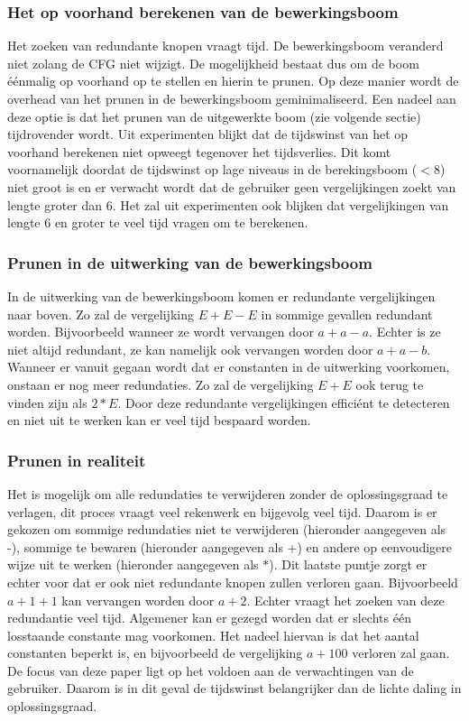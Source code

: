 \documentclass[Main.tex]{subfiles}
\begin{document}
\subsubsection*{Het op voorhand berekenen van de bewerkingsboom}
Het zoeken van redundante knopen vraagt tijd. De bewerkingsboom veranderd niet zolang de CFG niet wijzigt. De mogelijkheid bestaat dus om de boom \'e\'enmalig op voorhand op te stellen en hierin te prunen. Op deze manier wordt de overhead van het prunen in de bewerkingsboom geminimaliseerd. Een nadeel aan deze optie is dat het prunen van de uitgewerkte boom (zie volgende sectie) tijdrovender wordt. Uit experimenten blijkt dat de tijdswinst van het op voorhand berekenen niet opweegt tegenover het tijdsverlies. Dit komt voornamelijk doordat de tijdswinst op lage niveaus in de berekingsboom ($< 8$) niet groot is en er verwacht wordt dat de gebruiker geen vergelijkingen zoekt van lengte groter dan 6. Het zal uit experimenten ook blijken dat vergelijkingen van lengte 6 en groter te veel tijd vragen om te berekenen. 

\subsubsection*{Prunen in de uitwerking van de bewerkingsboom}
In de uitwerking van de bewerkingsboom komen er redundante vergelijkingen naar boven. Zo zal de vergelijking $E+E-E$ in sommige gevallen redundant worden. Bijvoorbeeld wanneer ze wordt vervangen door $a+a-a$. Echter is ze niet altijd redundant, ze kan namelijk ook vervangen worden door $a+a-b$. Wanneer er vanuit gegaan wordt dat er constanten in de uitwerking voorkomen, onstaan er nog meer redundaties. Zo zal de vergelijking $E+E$ ook terug te vinden zijn als $2*E$. Door deze redundante vergelijkingen effici\'ent te detecteren en niet uit te werken kan er veel tijd bespaard worden.

\subsubsection*{Prunen in realiteit}
Het is mogelijk om alle redundaties te verwijderen zonder de oplossingsgraad te verlagen, dit proces vraagt veel rekenwerk en bijgevolg veel tijd. Daarom is er gekozen om sommige redundaties niet te verwijderen (hieronder aangegeven als -), sommige te bewaren (hieronder aangegeven als +) en andere op eenvoudigere wijze uit te werken (hieronder aangegeven als $\ast$). Dit laatste puntje zorgt er echter voor dat er ook niet redundante knopen zullen verloren gaan. Bijvoorbeeld $a+1+1$ kan vervangen worden door $a+2$. Echter vraagt het zoeken van deze redundantie veel tijd. Algemener kan er gezegd worden dat er slechts \'e\'en losstaande constante mag voorkomen. Het nadeel hiervan is dat het aantal constanten beperkt is, en bijvoorbeeld de vergelijking $a+100$ verloren zal gaan. De focus van deze paper ligt op het voldoen aan de verwachtingen van de gebruiker. Daarom is in dit geval de tijdswinst belangrijker dan de lichte daling in oplossingsgraad. 
\end{document}

